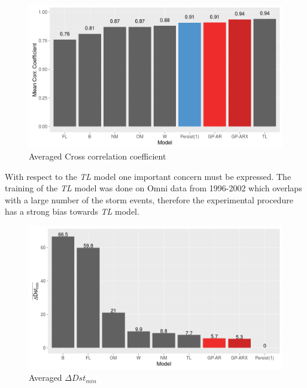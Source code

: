 \documentclass[referee,a4paper,12pt,traditabstract]{swsc}
\begin{document}
\begin{linenumbers}
\begin{figure}
   \centering
   \includegraphics[width=\textwidth]{Compare_CC.png}
      \caption{Averaged Cross correlation coefficient}
         \label{fig:cc}
   \end{figure}



With respect to the \emph{TL} model one important concern must be expressed. The training of the \emph{TL} model was done on Omni data from 1996-2002 which overlaps with a large number of the storm events, therefore the experimental procedure has a strong bias towards \emph{TL} model.


\begin{figure}
   \centering
   \includegraphics[width=\textwidth]{Compare_deltaDst.png}
      \caption{Averaged $\Delta Dst_{min}$}
         \label{fig:deltaDst}
   \end{figure}




\end{linenumbers}
\end{document}
